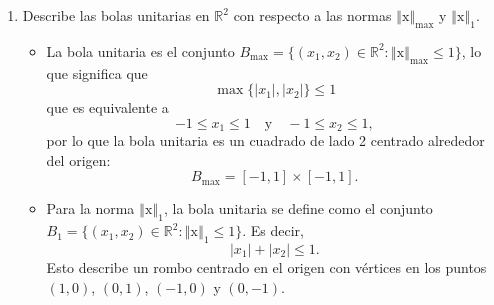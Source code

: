 \documentclass[12pt]{article}
\newcommand{\abs}[1]{\left\vert#1\right\vert}
\newcommand{\norm}[1]{\left\Vert#1\right\Vert}
\newcommand{\R}{\mathbb R}
\newcommand{\x}{\mathrm x}
\newcommand{\y}{\mathrm y}
\begin{document}
\begin{enumerate}
\begin{enumerate}[(1)]
Ahora, veamos que \(\norm{\x}_1\) es una norma:
\begin{itemize}
    \item \textbf{Positividad:} Por definición del valor absoluto, \(\abs{x_i} \geq 0\) y ya que la suma de valores no negativos es no negativa, \(\norm{\x}_1 \geq 0\) para cualquier vector \(\x \in \R^n\).
    
    Además, ya que \(\sum_{i \in [n]}\abs{x_i} = 0\) si y solo si \(\abs{x_i} = 0\) para cualquier índice \(i\), se sigue que \(\norm{\x}_1 = 0\) si y solo si \(\x = 0\).
    
    \item \textbf{Homogeneidad:} Sea \(\lambda \in \mathbb{R}\). Por definición del producto escalar, tenemos que 
    \[
    \norm{\lambda \x}_1 = \sum_{i = 1}^{n}\abs{\lambda x_i} = \sum_{i = 1}^{n}\abs{\lambda}\abs{x_i} = \abs{\lambda}\sum_{i = 1}^{n}\abs{x_i} = \abs{\lambda}\norm{\x}_1.
    \]
    
    \item \textbf{Desigualdad del triángulo:} Reescribimos
    \[
    \norm{\x}_1 + \norm{\y}_1 = \sum_{i = 1}^{n}\abs{x_i} + \sum_{i = 1}^{n}\abs{y_i}.
    \]
    Sumando término a término \(\abs{x_i} + \abs{y_i}\), obtenemos la expresión
    \[
    \sum_{i = 1}^{n}\abs{x_i} + \sum_{i = 1}^{n}\abs{y_i} = \sum_{i = 1}^{n}(\abs{x_i} + \abs{y_i}) \geq \sum_{i = 1}^{n}\abs{x_i + y_i}.
    \]
    Por lo tanto, 
    \[
    \norm{\x}_1 + \norm{\y}_1 \geq \norm{\x + \y}_1.
    \]
\end{itemize}

\item Describe las bolas unitarias en $\R^2$ con respecto a las normas $\norm{\x}_{\max}$ y $\norm{\x}_1$. 
\begin{itemize}
    \item La bola unitaria es el conjunto \(B_{\max} = \{(x_1, x_2) \in \R^2 : \norm{\x}_{\max} \leq 1\}\), lo que significa que
    \[
    \max\{\abs{x_1}, \abs{x_2}\} \leq 1
    \]
    que es equivalente a
    \[
    -1 \leq x_1 \leq 1 \quad \text{y} \quad -1 \leq x_2 \leq 1,
    \]
    por lo que la bola unitaria es un cuadrado de lado 2 centrado alrededor del origen:
    \[
    B_{\max} = [-1, 1] \times [-1, 1].
    \]
    \item Para la norma \(\norm{\x}_1\), la bola unitaria se define como el conjunto \(B_1 = \{(x_1, x_2) \in \R^2 : \norm{\x}_1 \leq 1\}\). Es decir, 
    \[
    \abs{x_1} + \abs{x_2} \leq 1.
    \]
    Esto describe un rombo centrado en el origen con vértices en los puntos \((1, 0)\), \((0, 1)\), \((-1, 0)\) y \((0, -1)\).
\end{itemize}
\end{enumerate}


\end{enumerate}
\end{document}

